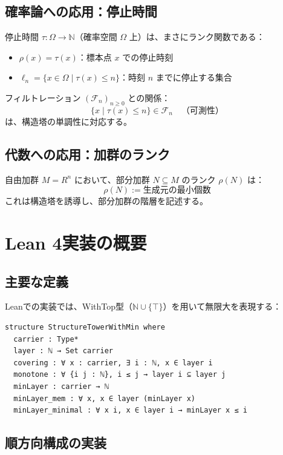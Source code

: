\documentclass[a4paper,11pt]{ltjsarticle}
\theoremstyle{definition}
\begin{document}
\subsection{確率論への応用：停止時間}

停止時間 $\tau : \Omega \to \mathbb{N}$（確率空間 $\Omega$ 上）は、まさにランク関数である：
\begin{itemize}
\item $\rho(x) = \tau(x)$：標本点 $x$ での停止時刻
\item $\ell_n = \{x \in \Omega \mid \tau(x) \leq n\}$：時刻 $n$ までに停止する集合
\end{itemize}

フィルトレーション $(\mathcal{F}_n)_{n \geq 0}$ との関係：
\[
\{x \mid \tau(x) \leq n\} \in \mathcal{F}_n \quad\text{（可測性）}
\]
は、構造塔の単調性に対応する。

\subsection{代数への応用：加群のランク}

自由加群 $M = R^n$ において、部分加群 $N \subseteq M$ のランク $\rho(N)$ は：
\[
\rho(N) := \text{生成元の最小個数}
\]
これは構造塔を誘導し、部分加群の階層を記述する。

\section{Lean 4実装の概要}

\subsection{主要な定義}

Leanでの実装では、WithTop型（$\mathbb{N} \cup \{\top\}$）を用いて無限大を表現する：

\begin{lstlisting}
structure StructureTowerWithMin where
  carrier : Type*
  layer : ℕ → Set carrier
  covering : ∀ x : carrier, ∃ i : ℕ, x ∈ layer i
  monotone : ∀ {i j : ℕ}, i ≤ j → layer i ⊆ layer j
  minLayer : carrier → ℕ
  minLayer_mem : ∀ x, x ∈ layer (minLayer x)
  minLayer_minimal : ∀ x i, x ∈ layer i → minLayer x ≤ i
\end{lstlisting}

\subsection{順方向構成の実装}
\end{document}
